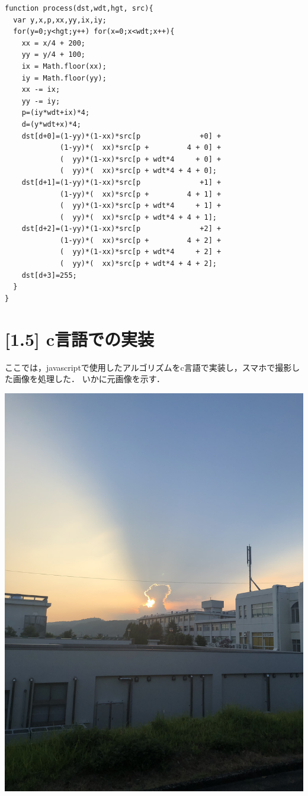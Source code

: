 \documentclass[11pt]{jarticle}
\begin{document}
\begin{lstlisting}
function process(dst,wdt,hgt, src){
  var y,x,p,xx,yy,ix,iy;
  for(y=0;y<hgt;y++) for(x=0;x<wdt;x++){
    xx = x/4 + 200;
    yy = y/4 + 100;
    ix = Math.floor(xx);
    iy = Math.floor(yy);
    xx -= ix;
    yy -= iy;
    p=(iy*wdt+ix)*4;
    d=(y*wdt+x)*4;
    dst[d+0]=(1-yy)*(1-xx)*src[p              +0] +
             (1-yy)*(  xx)*src[p +         4 + 0] +
             (  yy)*(1-xx)*src[p + wdt*4     + 0] +
             (  yy)*(  xx)*src[p + wdt*4 + 4 + 0];
    dst[d+1]=(1-yy)*(1-xx)*src[p              +1] +
             (1-yy)*(  xx)*src[p +         4 + 1] +
             (  yy)*(1-xx)*src[p + wdt*4     + 1] +
             (  yy)*(  xx)*src[p + wdt*4 + 4 + 1];
    dst[d+2]=(1-yy)*(1-xx)*src[p              +2] +
             (1-yy)*(  xx)*src[p +         4 + 2] +
             (  yy)*(1-xx)*src[p + wdt*4     + 2] +
             (  yy)*(  xx)*src[p + wdt*4 + 4 + 2];
    dst[d+3]=255;
  }
}
\end{lstlisting}

\section{[1.5] c言語での実装}

ここでは，javascriptで使用したアルゴリズムをc言語で実装し，スマホで撮影した画像を処理した．
いかに元画像を示す．

\includegraphics[scale=.1]{./img/tsuyama.jpg}
\end{document}
